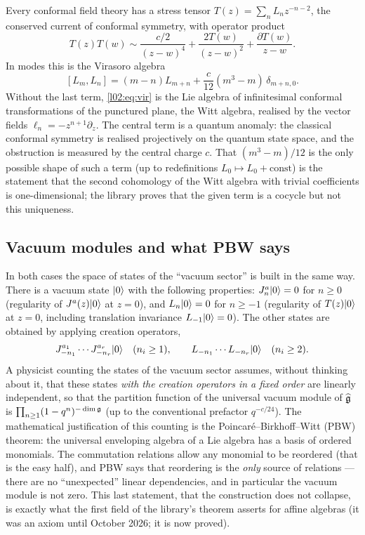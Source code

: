 Every conformal field theory has a stress tensor $T(z) = \sum_n L_n z^{-n-2}$, the conserved current
of conformal symmetry, with operator product
\begin{equation*}
 T(z)T(w) \sim \frac{c/2}{(z-w)^4} + \frac{2T(w)}{(z-w)^2} + \frac{\partial T(w)}{z-w}.
\end{equation*}
In modes this is the Virasoro algebra
\begin{equation}\label{l02:eq:vir}
 [L_m,L_n] = (m-n)L_{m+n} + \frac{c}{12}(m^3-m)\,\delta_{m+n,0}.
\end{equation}
Without the last term, \eqref{l02:eq:vir} is the Lie algebra of infinitesimal conformal
transformations of the punctured plane, the Witt algebra, realised by the vector fields
$\ell_n = -z^{n+1}\partial_z$. The central term is a quantum anomaly: the classical conformal
symmetry is realised projectively on the quantum state space, and the obstruction is measured by
the central charge $c$. That $(m^3-m)/12$ is the only possible shape of such a term (up to
redefinitions $L_0\mapsto L_0 + \text{const}$) is the statement that the second cohomology of the
Witt algebra with trivial coefficients is one-dimensional; the library proves that the given term is
a cocycle but not this uniqueness.

\subsection{Vacuum modules and what PBW says}

In both cases the space of states of the ``vacuum sector'' is built in the same way. There is a
vacuum state $|0\rangle$ with the following properties: $J^a_n|0\rangle = 0$ for $n\ge0$ (regularity of $J^a(z)|0\rangle$ at $z = 0$), and
$L_n|0\rangle = 0$ for $n\ge-1$ (regularity of $T(z)|0\rangle$ at $z=0$, including translation
invariance $L_{-1}|0\rangle = 0$). The other states are obtained by applying creation operators,
\begin{equation*}
 J^{a_1}_{-n_1}\cdots J^{a_r}_{-n_r}|0\rangle \quad (n_i\ge1), \qquad
 L_{-n_1}\cdots L_{-n_r}|0\rangle\quad(n_i\ge2).
\end{equation*}
A physicist counting the states of the vacuum sector assumes, without thinking about it, that
these states \emph{with the creation operators in a fixed order} are linearly independent, so that
the partition function of the universal vacuum module of $\widehat{\mathfrak{g}}$ is
$\prod_{n\ge1}(1-q^n)^{-\dim\mathfrak{g}}$ (up to the conventional prefactor $q^{-c/24}$). The
mathematical justification of this counting is the Poincar\'e--Birkhoff--Witt (PBW) theorem: the
universal enveloping algebra of a Lie algebra has a basis of ordered monomials. The commutation
relations allow any monomial to be reordered (that is the easy half), and PBW says that reordering
is the \emph{only} source of relations --- there are no ``unexpected'' linear dependencies, and in
particular the vacuum module is not zero. This last statement, that the construction does not
collapse, is exactly what the first field of the library's theorem  asserts for affine
algebras (it was an axiom until October 2026; it is now proved).

